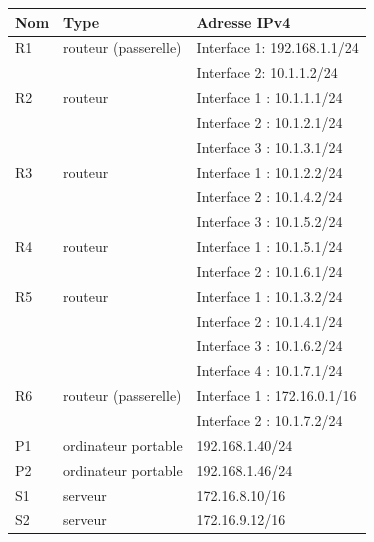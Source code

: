 \documentclass[11pt,a4paper]{article}
\begin{document}
\begin{center}
\renewcommand{\arraystretch}{0.6}
\begin{tabular}{|L{2cm}|L{4cm}|L{5cm}|}\hline
Nom & Type & Adresse IPv4 \\\hline
R1 & routeur (passerelle) & Interface 1: 192.168.1.1/24\\
& & Interface 2: 10.1.1.2/24\\\hline
R2 & routeur & Interface 1 : 10.1.1.1/24\\
& & Interface 2 : 10.1.2.1/24\\
& & Interface 3 : 10.1.3.1/24\\\hline
R3 & routeur & Interface 1 : 10.1.2.2/24\\
& & Interface 2 : 10.1.4.2/24\\
& & Interface 3 : 10.1.5.2/24\\\hline
R4 & routeur & Interface 1 : 10.1.5.1/24\\
& & Interface 2 : 10.1.6.1/24\\\hline
R5 & routeur & Interface 1 : 10.1.3.2/24\\
& & Interface 2 : 10.1.4.1/24\\
& & Interface 3 : 10.1.6.2/24\\
& & Interface 4 : 10.1.7.1/24\\\hline
R6 & routeur (passerelle) & Interface 1 : 172.16.0.1/16\\
& & Interface 2 : 10.1.7.2/24\\\hline
P1 & ordinateur portable & 192.168.1.40/24\\\hline
P2 & ordinateur portable & 192.168.1.46/24\\\hline
S1 & serveur & 172.16.8.10/16\\\hline
S2 & serveur & 172.16.9.12/16\\\hline
\end{tabular}
\end{center}
\end{document}
